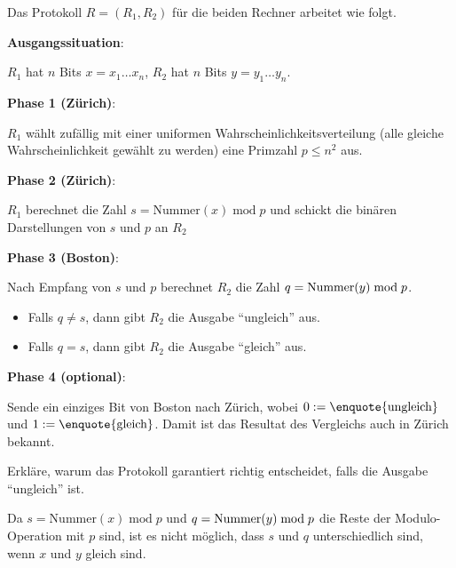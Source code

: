 Das Protokoll $R = (R_1,R_2)$ für die beiden Rechner arbeitet wie folgt.
\begin{myprocedure}[Kommunikationsprotokoll]\label{myprocedure:protokoll}
	\textbf{Ausgangssituation}:

	$R_1$ hat $n$ Bits $x=x_1\ldots x_n$, $R_2$ hat $n$ Bits $y = y_1\ldots y_n$.

	\textbf{Phase 1 (Zürich)}:

	$R_1$ wählt zufällig mit einer uniformen Wahrscheinlichkeitsverteilung (alle gleiche Wahrscheinlichkeit gewählt zu werden) eine Primzahl $p \leq n^2$ aus.


	\textbf{Phase 2 (Zürich)}:

	$R_1$ berechnet die Zahl $s = \text{Nummer}(x)\; \text{mod} \; p$ und schickt die binären Darstellungen von $s$ und $p$ an $R_2$


	\textbf{Phase 3 (Boston)}:

	Nach Empfang von $s$ und $p$ berechnet $R_2$ die Zahl $q = \text{Nummer}(y)\; \text{\text{mod}} \; p$.
	\begin{itemize}
		\item Falls $q\neq s$, dann gibt $R_2$ die Ausgabe \enquote{ungleich} aus.
		\item Falls $q = s$, dann gibt $R_2$ die Ausgabe \enquote{gleich} aus.
	\end{itemize}


	\textbf{Phase 4 (optional)}:

	Sende ein einziges Bit von Boston nach Zürich, wobei $0 := \text{\enquote{ungleich}}$ und $1 := \text{\enquote{gleich}}$. Damit ist das Resultat des Vergleichs auch in Zürich bekannt.
\end{myprocedure}

\begin{myexercise}
	Erkläre, warum das Protokoll garantiert richtig entscheidet, falls die Ausgabe \enquote{ungleich} ist.
	\begin{myanswer}
		Da $s = \text{Nummer}(x)\; \text{mod} \; p$ und $q = \text{Nummer}(y)\; \text{\text{mod}} \; p$ die Reste der Modulo-Operation mit $p$ sind, ist es nicht möglich, dass $s$ und $q$ unterschiedlich sind, wenn $x$ und $y$ gleich sind.
	\end{myanswer}
\end{myexercise}

